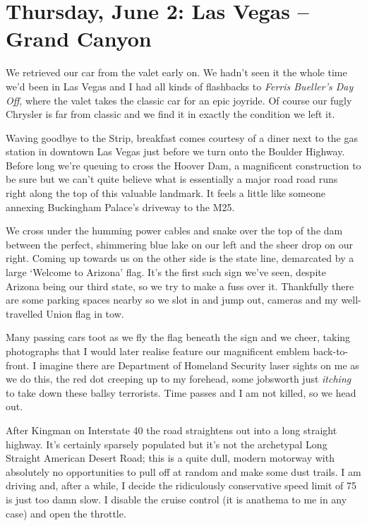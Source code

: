 \documentclass[a5paper,10pt,titlepage,draft]{book}
\begin{document}
\chapter[Las Vegas -- Grand Canyon]{Thursday, June 2: Las Vegas -- Grand Canyon}
We retrieved our car from the valet early on.  We hadn't seen it the whole time we'd been in Las Vegas and I had all kinds of flashbacks to \emph{Ferris Bueller's Day Off}, where the valet takes the classic car for an epic joyride.  Of course our fugly Chrysler is far from classic and we find it in exactly the condition we left it.

Waving goodbye to the Strip, breakfast comes courtesy of a diner next to the gas station in downtown Las Vegas just before we turn onto the Boulder Highway.  Before long we're queuing to cross the Hoover Dam, a magnificent construction to be sure but we can't quite believe what is essentially a major road road runs right along the top of this valuable landmark.  It feels a little like someone annexing Buckingham Palace's driveway to the M25.

We cross under the humming power cables and snake over the top of the dam between the perfect, shimmering blue lake on our left and the sheer drop on our right.  Coming up towards us on the other side is the state line, demarcated by a large `Welcome to Arizona' flag.  It's the first such sign we've seen, despite Arizona being our third state, so we try to make a fuss over it.  Thankfully there are some parking spaces nearby so we slot in and jump out, cameras and my well-travelled Union flag in tow.

Many passing cars toot as we fly the flag beneath the sign and we cheer, taking photographs that I would later realise feature our magnificent emblem back-to-front.  I imagine there are Department of Homeland Security laser sights on me as we do this, the red dot creeping up to my forehead, some jobsworth just \emph{itching} to take down these ballsy terrorists.  Time passes and I am not killed, so we head out.

After Kingman on Interstate 40 the road straightens out into a long straight highway.  It's certainly sparsely populated but it's not the archetypal Long Straight American Desert Road; this is a quite dull, modern motorway with absolutely no opportunities to pull off at random and make some dust trails.  I am driving and, after a while, I decide the ridiculously conservative speed limit of 75 is just too damn slow.  I disable the cruise control (it is anathema to me in any case) and open the throttle.
\end{document}
